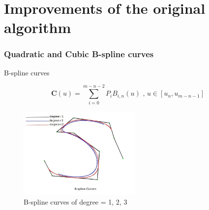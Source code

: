 \documentclass[english,10pt,presentation]{beamer}
\begin{document}
\section{Improvements of the original algorithm}
\label{sec-3}
\begin{frame}
\frametitle{Quadratic and Cubic B-spline curves}
\label{sec-3_1}
\begin{exampleblock}{B-spline curves}
\label{sec-3_1_1}

\begin{equation*}
  \mathbf{C}(u) =  \sum_{i=0}^{m-n-2} P_{i} B_{i,n}(u) \mbox{ , } u \in [u_{n},u_{m-n-1}]
\end{equation*}
\begin{figure}[htb]
\centering
\includegraphics[width=6cm,angle=0]{./bspline.jpg}
\caption{\label{fig: bspline}B-spline curves of degree = 1, 2, 3}
\end{figure}
\end{exampleblock}
\end{frame}
\end{document}
